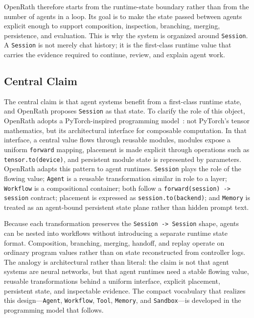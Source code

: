 \documentclass{llmxive}
\begin{document}
OpenRath therefore starts from the runtime-state boundary rather than from the number of agents in a loop. Its goal is to make the state passed between agents explicit enough to support composition, inspection, branching, merging, persistence, and evaluation. This is why the system is organized around \texttt{Session}. A \texttt{Session} is not merely chat history; it is the first-class runtime value that carries the evidence required to continue, review, and explain agent work.



\subsection{Central Claim}

The central claim is that agent systems benefit from a first-class runtime state, and OpenRath proposes \texttt{Session} as that state. To clarify the role of this object, OpenRath adopts a PyTorch-inspired programming model~\cite{pytorch}: not PyTorch's tensor mathematics, but its architectural interface for composable computation. In that interface, a central value flows through reusable modules, modules expose a uniform \texttt{forward} mapping, placement is made explicit through operations such as \texttt{tensor.to(device)}, and persistent module state is represented by parameters. OpenRath adapts this pattern to agent runtimes. \texttt{Session} plays the role of the flowing value; \texttt{Agent} is a reusable transformation similar in role to a layer; \texttt{Workflow} is a compositional container; both follow a \texttt{forward(session) -> session} contract; placement is expressed as \texttt{session.to(backend)}; and \texttt{Memory} is treated as an agent-bound persistent state plane rather than hidden prompt text.

Because each transformation preserves the \texttt{Session -> Session} shape, agents can be nested into workflows without introducing a separate runtime state format. Composition, branching, merging, handoff, and replay operate on ordinary program values rather than on state reconstructed from controller logs. The analogy is architectural rather than literal: the claim is not that agent systems are neural networks, but that agent runtimes need a stable flowing value, reusable transformations behind a uniform interface, explicit placement, persistent state, and inspectable evidence. The compact vocabulary that realizes this design---\texttt{Agent}, \texttt{Workflow}, \texttt{Tool}, \texttt{Memory}, and \texttt{Sandbox}---is developed in the programming model that follows.
\end{document}
